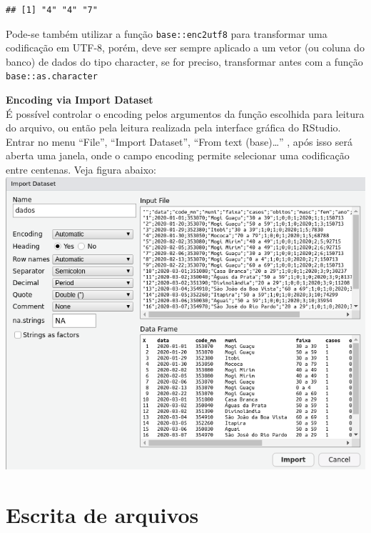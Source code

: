 \documentclass[
]{book}
\newenvironment{Shaded}{\begin{snugshade}}{\end{snugshade}}
\newcommand{\FunctionTok}[1]{\textcolor[rgb]{0.00,0.00,0.00}{#1}}
\newcommand{\NormalTok}[1]{#1}
\newcommand{\OtherTok}[1]{\textcolor[rgb]{0.56,0.35,0.01}{#1}}
\newcommand{\SpecialCharTok}[1]{\textcolor[rgb]{0.00,0.00,0.00}{#1}}
\theoremstyle{definition}
\theoremstyle{definition}
\theoremstyle{definition}
\theoremstyle{definition}
\theoremstyle{remark}
\begin{document}
\begin{verbatim}
## [1] "4" "4" "7"
\end{verbatim}

Pode-se também utilizar a função \texttt{base::enc2utf8} para transformar uma codificação em UTF-8, porém, deve ser sempre aplicado a um vetor (ou coluna do banco) de dados do tipo character, se for preciso, transformar antes com a função \texttt{base::as.character}

\begin{Shaded}
\end{Shaded}

\textbf{Encoding via Import Dataset}\\
É possível controlar o encoding pelos argumentos da função escolhida para leitura do arquivo, ou então pela leitura realizada pela interface gráfica do RStudio. Entrar no menu ``File'', ``Import Dataset'', ``From text (base)\ldots{}'' , após isso será aberta uma janela, onde o campo encoding permite selecionar uma codificação entre centenas. Veja figura abaixo:
\includegraphics{ilustracoes/import_dataset.png}

\hypertarget{escrita-de-arquivos}{%
\section{Escrita de arquivos}\label{escrita-de-arquivos}}
\end{document}
